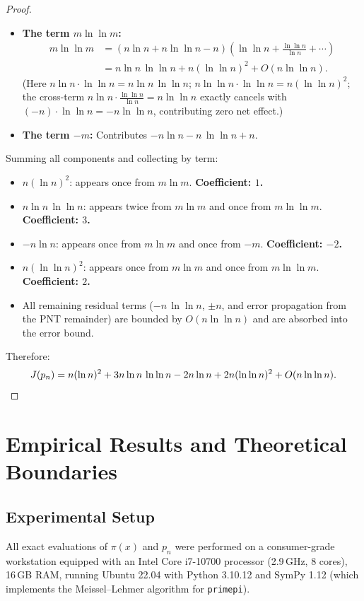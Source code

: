 \documentclass[11pt, a4paper]{article}
\begin{document}
\begin{proof}
\begin{itemize}
\item \textbf{The term $m \ln \ln m$:}
\begin{align*}
m \ln \ln m &= (n \ln n + n \ln \ln n - n) \left(\ln \ln n + \frac{\ln \ln n}{\ln n} + \cdots \right) \\
&= n \ln n \,\ln \ln n + n(\ln \ln n)^2 + O(n \ln \ln n).
\end{align*}
(Here $n \ln n \cdot \ln \ln n = n \ln n \,\ln \ln n$; $n \ln \ln n \cdot \ln \ln n = n(\ln \ln n)^2$; the cross-term $n \ln n \cdot \frac{\ln \ln n}{\ln n} = n \ln \ln n$ exactly cancels with $(-n) \cdot \ln \ln n = -n \ln \ln n$, contributing zero net effect.)

\item \textbf{The term $-m$:} Contributes $-n \ln n - n\,\ln \ln n + n$.
\end{itemize}
Summing all components and collecting by term:
\begin{itemize}
\item $n(\ln n)^2$: appears once from $m \ln m$. \textbf{Coefficient: $1$.}
\item $n \ln n \,\ln \ln n$: appears twice from $m \ln m$ and once from $m \ln \ln m$. \textbf{Coefficient: $3$.}
\item $-n \ln n$: appears once from $m \ln m$ and once from $-m$. \textbf{Coefficient: $-2$.}
\item $n(\ln \ln n)^2$: appears once from $m \ln m$ and once from $m \ln \ln m$. \textbf{Coefficient: $2$.}
\item All remaining residual terms ($-n\,\ln\ln n$, $\pm n$, and error propagation from the PNT remainder) are bounded by $O(n \ln \ln n)$ and are absorbed into the error bound.
\end{itemize}
Therefore:
\[
J(p_n) = n(\ln n)^2 + 3n \ln n \,\ln \ln n - 2n \ln n + 2n(\ln \ln n)^2 + O(n \ln \ln n). \qedhere
\]
\end{proof}

\section{Empirical Results and Theoretical Boundaries}

\subsection{Experimental Setup}
All exact evaluations of $\pi(x)$ and $p_n$ were performed on a consumer-grade workstation equipped with an Intel Core i7-10700 processor (2.9\,GHz, 8 cores), 16\,GB RAM, running Ubuntu 22.04 with Python 3.10.12 and SymPy 1.12 (which implements the Meissel--Lehmer algorithm for \texttt{primepi}).
\end{document}
